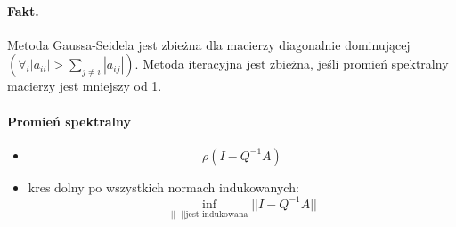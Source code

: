 \documentclass{article}
\begin{document}
\paragraph{Fakt.} Metoda Gaussa-Seidela jest zbieżna dla macierzy diagonalnie dominującej $ (\forall_{i}|a_{ii}|>\sum_{j\not=i}|a_{ij}|) $.
Metoda iteracyjna jest zbieżna, jeśli promień spektralny macierzy jest mniejszy od 1.
\paragraph{Promień spektralny} 
\begin{itemize}
	\item$$ \rho(I-Q^{-1}A) $$
	\item kres dolny po wszystkich normach indukowanych:
	$$\inf_{||\cdot||\text{jest indukowana}}||I-Q^{-1}A ||$$
\end{itemize}
\end{document}
